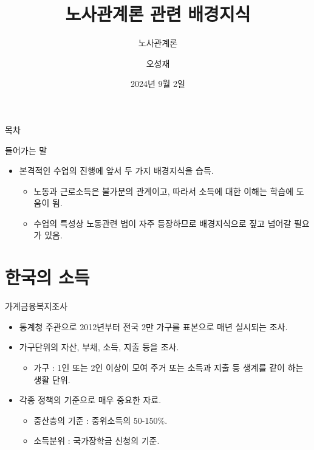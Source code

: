 \documentclass[aspectratio=169,xcolor=dvipsnames,handout]{beamer}
\title[들어가는 말]{노사관계론 관련 배경지식} %
\subtitle{노사관계론}
\author[오성재]{오성재}
\institute[CNU] %
{
    충남대학교 경제학과\\
}
\date{2024년 9월 2일}
\begin{document}
\begin{frame}
    \titlepage
\end{frame}

\begin{frame}{목차}
    \tableofcontents
\end{frame}

\begin{frame}{들어가는 말}
    \begin{itemize}
        \item 본격적인 수업의 진행에 앞서 두 가지 배경지식을 습득.
        \begin{itemize}
            \item 노동과 근로소득은 불가분의 관계이고, 따라서 소득에 대한 이해는 학습에 도움이 됨.
            \item 수업의 특성상 노동관련 법이 자주 등장하므로 배경지식으로 짚고 넘어갈 필요가 있음.
        \end{itemize}
    \end{itemize}
\end{frame}
\section{한국의 소득}

\begin{frame}{가계금융복지조사}
    \begin{itemize}
        \item 통계청 주관으로 2012년부터 전국 2만 가구를 표본으로 매년 실시되는 조사.
        \item 가구단위의 자산, 부채, 소득, 지출 등을 조사.
        \begin{itemize}
            \item 가구 : 1인 또는 2인 이상이 모여 주거 또는 소득과 지출 등 생계를 같이 하는 생활 단위.
        \end{itemize}
        \item 각종 정책의 기준으로 매우 중요한 자료.
        \begin{itemize}
            \item 중산층의 기준 : 중위소득의 50-150\%.
            \item 소득분위 : 국가장학금 신청의 기준.
        \end{itemize}
    \end{itemize}
\end{frame}
\end{document}
